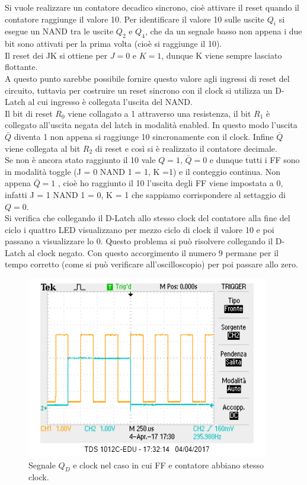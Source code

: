\documentclass[10pt,a4paper]{article}
\begin{document}
Si vuole realizzare un contatore decadico sincrono, cioè attivare il reset quando il contatore raggiunge il valore 10. Per identificare il valore 10 sulle uscite $Q_i$ si esegue un NAND tra le uscite $Q_2$ e $Q_4$, che da un segnale basso non appena i due bit sono attivati per la prima volta (cioè si raggiunge il 10). \\
Il reset dei JK si ottiene per $J = 0$ e $K = 1$, dunque K viene sempre lasciato flottante.\\
A questo punto sarebbe possibile fornire questo valore agli ingressi di reset del circuito, tuttavia per costruire un reset sincrono con il clock si utilizza un D-Latch al cui ingresso è collegata l'uscita del NAND.\\
Il bit di reset $R_0$ viene collagato a 1 attraverso una resistenza, il bit $R_1$ è collegato all'uscita negata del latch in modalità enabled. In questo modo l'uscita $\bar{Q}$ diventa 1 non appena si raggiunge 10 sincronamente con il clock. Infine $\bar{Q}$ viene collegata al bit $R_2$ di reset e così si è realizzato il contatore decimale.\\
Se non è ancora stato raggiunto il 10 vale $Q = 1$, $\bar{Q} = 0$ e dunque tutti i FF sono in modalità toggle (J = 0 NAND 1 = 1, K =1) e il conteggio continua. Non appena $\bar{Q} = 1$ , cioè ho raggiunto il 10 l'uscita degli FF viene impostata a 0, infatti J = 1 NAND 1 = 0, K = 1 che sappiamo corrispondere al settaggio di $Q = 0$.\\
Si verifica che collegando il D-Latch allo stesso clock del contatore alla fine del ciclo i quattro LED visualizzano per mezzo ciclo di clock il valore 10 e poi passano a visualizzare lo 0. Questo problema si può risolvere collegando il D-Latch al clock negato. Con questo accorgimento il numero 9 permane per il tempo corretto (come si può verificare all'oscilloscopio) per poi passare allo zero.\\


\begin{figure}
\centering
\includegraphics[scale=1.0]{clocksbagliato.png}
\caption{Segnale $Q_D$ e clock nel caso in cui FF e contatore abbiano stesso clock.\label{sbagliato}}
\end{figure}
\end{document}
